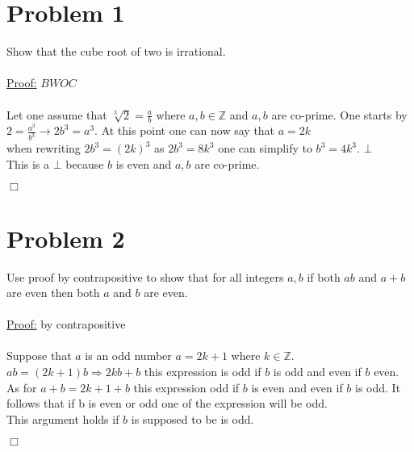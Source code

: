\documentclass[12pt]{article}
\begin{document}
\maketitle

\section*{Problem 1}\label{Problem 1}
Show that the cube root of two is irrational.\\
\\
\underline{Proof:} $BWOC$\\
\\
Let one assume that $\sqrt[3]{2} = \frac{a}{b}$ where $a,b \in \mathbb{Z}$ and $a,b$ 
are co-prime.
One starts by $2 = \frac{a^3}{b^3} \rightarrow 2b^3 = a^3$. At this point one can now say that 
$a = 2k$\\
when rewriting $2b^3= (2k)^3$ as $2b^3 = 8k^3$ one can simplify to $b^3 = 4 k^3$. $\bot$\\
This is a $\bot$ because $b$ is even and $a,b$ are co-prime.
\begin{flushright}
        $\Box$
\end{flushright}
\section*{Problem 2}\label{Problem 2}
Use proof by contrapositive to show that for all integers $a,b$ if both $ab$
and $a+b$ are even then both $a$ and $b$ are even.\\
\\
\underline{Proof:} by contrapositive\\
\\
Suppose that $a$ is an odd number $a = 2k +1$ where $k \in \mathbb{Z}$.\\
$ab = (2k+1)b \Rightarrow 2kb + b$ this expression is odd if $b$ is odd and even if $b$ even.
As for $a+b = 2k + 1 +b$ this expression odd if $b$ is even and even if $b$ is odd. It follows
that if b is even or odd one of the expression will be odd.\\

This argument holds if $b$ is supposed to be is odd.
\begin{flushright}
        $\Box$
\end{flushright}
\end{document}
